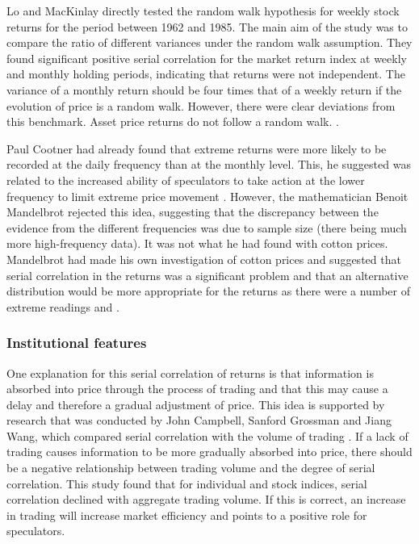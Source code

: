 \documentclass[12pt, a4paper, oneside]{article} %
\begin{document}
Lo and MacKinlay directly tested the random walk hypothesis for weekly stock returns for the period between 1962 and 1985. The main aim of the study was to compare the ratio of different variances under the random walk assumption.  They found significant positive serial correlation for the market return index at weekly and monthly holding periods, indicating that returns were not independent.  The variance of a monthly return should be four times that of a weekly return if the evolution of price is a random walk.  However, there were clear deviations from this benchmark.    Asset price returns do not follow a random walk. \citep{LoMacKinlay1988}.  

Paul Cootner had already found that extreme returns were more likely to be recorded at the daily frequency than at the monthly level.  This, he suggested was related to the increased ability of speculators to take action at the lower frequency to limit extreme price movement \citep{Cootner1962}. However, the mathematician Benoit Mandelbrot rejected this idea, suggesting that the discrepancy between the evidence from the different frequencies was due to sample size (there being much more high-frequency data).  It was not what he had found with cotton prices.  Mandelbrot had made his own investigation of cotton prices and suggested that serial correlation in the returns was a significant problem and that an alternative distribution would be more appropriate for the returns as there were a number of extreme readings \citep{Mandelbrot1963} and \citep{Mandelbrot1971}.  

\subsubsection{Institutional features}
One explanation for this serial correlation of returns is that information is absorbed into price through the process of trading and that this may cause a delay and therefore a gradual adjustment of price.  This idea is supported by research that was conducted by John Campbell, Sanford Grossman and Jiang Wang, which compared serial correlation with the volume of trading \citep{CampbellGrossmanWang}.  If a lack of trading causes information to be more gradually absorbed into price, there should be a negative relationship between trading volume and the degree of serial correlation.  This study found that for individual and stock indices, serial correlation declined with aggregate trading volume.  If this is correct, an increase in trading will increase market efficiency and points to a positive role for speculators. 
\end{document}
